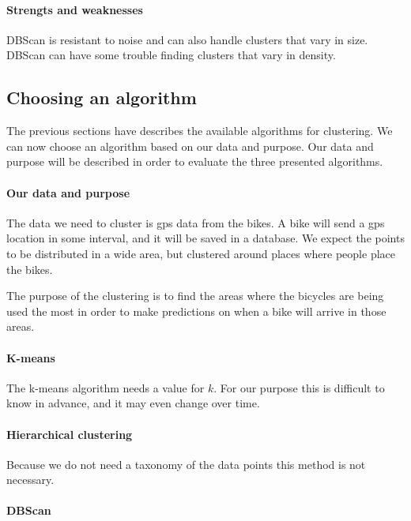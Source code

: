 \paragraph{Strengts and weaknesses}
DBScan is resistant to noise and can also handle clusters that vary in size.
DBScan can have some trouble finding clusters that vary in density.

\subsection{Choosing an algorithm}
The previous sections have describes the available algorithms for clustering.
We can now choose an algorithm based on our data and purpose.
Our data and purpose will be described in order to evaluate the three presented algorithms.

\paragraph{Our data and purpose}
The data we need to cluster is gps data from the bikes.
A bike will send a gps location in some interval, and it will be saved in a database.
We expect the points to be distributed in a wide area, but clustered around places where people place the bikes.

The purpose of the clustering is to find the areas where the bicycles are being used the most in order to make predictions on when a bike will arrive in those areas.

\paragraph{K-means}
The k-means algorithm needs a value for $ k $.
For our purpose this is difficult to know in advance, and it may even change over time.

\paragraph{Hierarchical clustering}
Because we do not need a taxonomy of the data points this method is not necessary.

\paragraph{DBScan}



